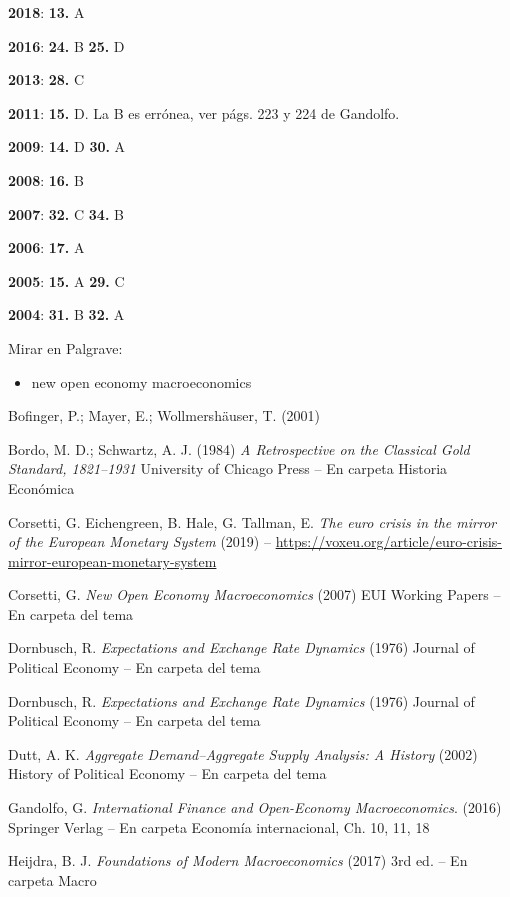 \documentclass{nuevotema}
\begin{document}
\notas

\textbf{2018}: \textbf{13.} A

\textbf{2016}: \textbf{24.} B \textbf{25.} D

\textbf{2013}: \textbf{28.} C

\textbf{2011}: \textbf{15.} D. La B es errónea, ver págs. 223 y 224 de Gandolfo.

\textbf{2009}: \textbf{14.} D \textbf{30.} A

\textbf{2008}: \textbf{16.} B

\textbf{2007}: \textbf{32.} C \textbf{34.} B

\textbf{2006}: \textbf{17.} A

\textbf{2005}: \textbf{15.} A \textbf{29.} C

\textbf{2004}: \textbf{31.} B \textbf{32.} A

\bibliografia

Mirar en Palgrave:
\begin{itemize}
	\item new open economy macroeconomics
\end{itemize}

Bofinger, P.; Mayer, E.; Wollmershäuser, T. (2001)

Bordo, M. D.; Schwartz, A. J. (1984) \textit{A Retrospective on the Classical Gold Standard, 1821--1931} University of Chicago Press -- En carpeta Historia Económica

Corsetti, G. Eichengreen, B. Hale, G. Tallman, E. \textit{The euro crisis in the mirror of the European Monetary System} (2019) -- \url{https://voxeu.org/article/euro-crisis-mirror-european-monetary-system}

Corsetti, G. \textit{New Open Economy Macroeconomics} (2007) EUI Working Papers -- En carpeta del tema

Dornbusch, R. \textit{Expectations and Exchange Rate Dynamics} (1976) Journal of Political Economy -- En carpeta del tema

Dornbusch, R. \textit{Expectations and Exchange Rate Dynamics} (1976) Journal of Political Economy -- En carpeta del tema

Dutt, A. K. \textit{Aggregate Demand–Aggregate Supply Analysis: A History} (2002) History of Political Economy -- En carpeta del tema

Gandolfo, G. \textit{International Finance and Open-Economy Macroeconomics}. (2016) Springer Verlag -- En carpeta Economía internacional, Ch. 10, 11, 18

Heijdra, B. J. \textit{Foundations of Modern Macroeconomics} (2017) 3rd ed. -- En carpeta Macro
\end{document}
